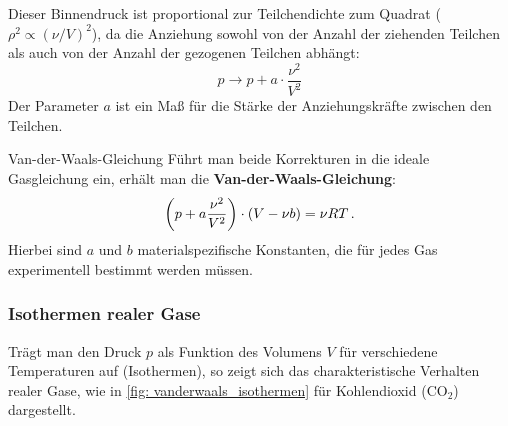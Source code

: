 Dieser Binnendruck ist proportional zur Teilchendichte zum Quadrat ($\rho^2 \propto (\nu/V)^2$), da die Anziehung sowohl von der Anzahl der ziehenden Teilchen als auch von der Anzahl der gezogenen Teilchen abhängt:
\begin{equation}
    p \rightarrow p + a \cdot \frac{\nu^2}{V^2}
\end{equation}
Der Parameter $a$ ist ein Maß für die Stärke der Anziehungskräfte zwischen den Teilchen.

\begin{importantbox}{Van-der-Waals-Gleichung}
    Führt man beide Korrekturen in die ideale Gasgleichung ein, erhält man die \textbf{Van-der-Waals-Gleichung}:
    \begin{equation}\label{eq: van_der_waals}
        \left( p + a \frac{\nu^2}{V^2} \right) \cdot (V - \nu b) = \nu R T \,.
    \end{equation}
    Hierbei sind $a$ und $b$ materialspezifische Konstanten, die für jedes Gas experimentell bestimmt werden müssen.
\end{importantbox}

\subsubsection{Isothermen realer Gase}
Trägt man den Druck $p$ als Funktion des Volumens $V$ für verschiedene Temperaturen auf (Isothermen), so zeigt sich das charakteristische Verhalten realer Gase, wie in \cref{fig: vanderwaals_isothermen} für Kohlendioxid ($\text{CO}_2$) dargestellt.

